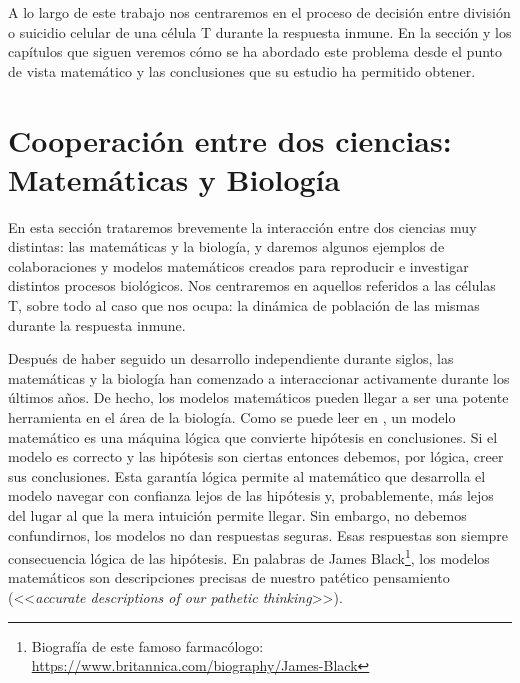 A lo largo de este trabajo nos centraremos en el proceso de decisión entre división o suicidio celular de una célula T durante la respuesta inmune. En la sección y los capítulos que siguen veremos cómo se ha abordado este problema desde el punto de vista matemático y las conclusiones que su estudio ha permitido obtener. 


\section{Cooperación entre dos ciencias: Matemáticas y Biología}
\label{sec:coop}

En esta sección trataremos brevemente la interacción entre dos ciencias muy distintas: las matemáticas y la biología, y daremos algunos ejemplos de colaboraciones y modelos matemáticos creados para reproducir e investigar distintos procesos biológicos. Nos centraremos en aquellos referidos a las células T, sobre todo al caso que nos ocupa: la dinámica de población de las mismas durante la respuesta inmune.

Después de haber seguido un desarrollo independiente durante siglos, las matemáticas y la biología  han comenzado a interaccionar activamente durante los últimos años.
%
De hecho, los modelos matemáticos pueden llegar a ser una potente herramienta en el área de la biología. Como se puede leer en \cite{Gunawardena2014}, un modelo matemático es una máquina lógica que convierte hipótesis en conclusiones. Si el modelo es correcto y las hipótesis son ciertas entonces debemos, por lógica, creer sus conclusiones. Esta garantía lógica permite al matemático que desarrolla el modelo navegar con confianza lejos de las hipótesis y, probablemente, más lejos del lugar al que la mera intuición permite llegar. Sin embargo, no debemos confundirnos, los modelos no dan respuestas seguras. Esas respuestas son siempre consecuencia lógica de las hipótesis. En palabras de James Black\footnote{Biografía de este famoso farmacólogo: \url{https://www.britannica.com/biography/James-Black}}, los modelos matemáticos son descripciones precisas de nuestro patético pensamiento (<<\textit{accurate descriptions of our pathetic thinking}>>).

